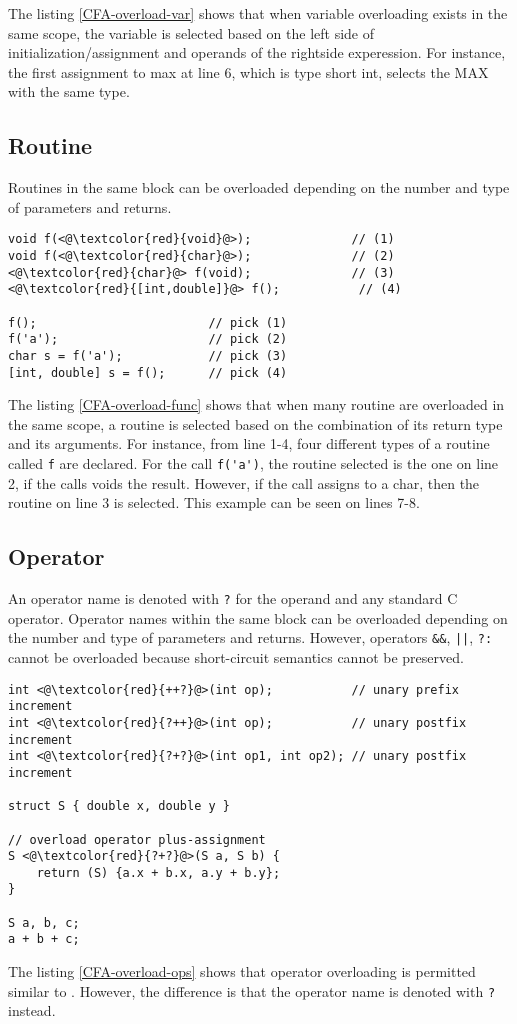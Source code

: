 The listing \ref{CFA-overload-var} shows that when variable overloading exists
in the same scope, the variable is selected based on the left side of
initialization/assignment and operands of the rightside experession. For
instance, the first assignment to max at line 6, which is type short int,
selects the MAX with the same type.

\subsection{Routine}
Routines in the same block can be overloaded depending on the number and type of
parameters and returns.


\begin{lstlisting}[caption={Overloading routines in \CFA},
label={CFA-overload-func}]
void f(<@\textcolor{red}{void}@>);              // (1)
void f(<@\textcolor{red}{char}@>);              // (2)
<@\textcolor{red}{char}@> f(void);              // (3)
<@\textcolor{red}{[int,double]}@> f();           // (4)

f();                        // pick (1)
f('a');                     // pick (2)
char s = f('a');            // pick (3)
[int, double] s = f();      // pick (4)
\end{lstlisting}

The listing \ref{CFA-overload-func} shows that when many routine are overloaded in
the same scope, a routine is selected based on the combination of its return type and its
arguments. For instance, from line 1-4, four different types of a routine called
\verb|f| are declared. For the call \verb|f('a')|, the routine selected is the
one on line 2, if the calls voids the result. However, if the call assigns to a
char, then the routine on line 3 is selected. This example can be seen on lines
7-8.

\subsection{Operator}
An operator name is denoted with \verb|?| for the operand and any standard C
operator. Operator names within the same block can be overloaded depending on
the number and type of parameters and returns. However, operators \verb|&&|,
\verb-||-, \verb|?:| cannot be overloaded because short-circuit semantics
cannot be preserved.


\begin{lstlisting}[caption={Overloading operators in \CFA},
label={CFA-overload-ops}]
int <@\textcolor{red}{++?}@>(int op);           // unary prefix increment
int <@\textcolor{red}{?++}@>(int op);           // unary postfix increment
int <@\textcolor{red}{?+?}@>(int op1, int op2); // unary postfix increment

struct S { double x, double y }

// overload operator plus-assignment
S <@\textcolor{red}{?+?}@>(S a, S b) {
    return (S) {a.x + b.x, a.y + b.y};
}

S a, b, c;
a + b + c;
\end{lstlisting}

The listing \ref{CFA-overload-ops} shows that operator overloading is permitted
similar to \CCS. However, the difference is that the operator name is
denoted with \verb|?| instead.
